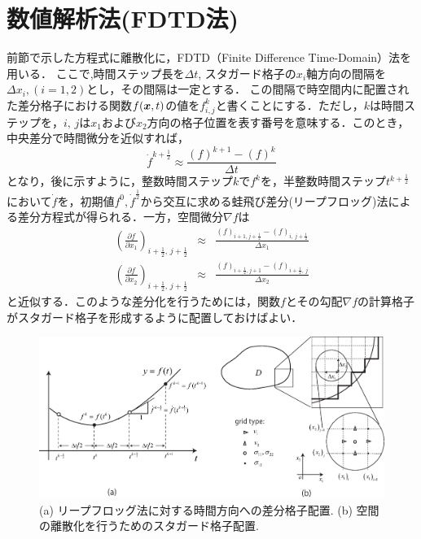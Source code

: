 \section{数値解析法(FDTD法)}
前節で示した方程式に離散化に，FDTD（Finite Difference Time-Domain）法を用いる．
ここで,時間ステップ長を$\Delta t$, スタガード格子の$x_i$軸方向の間隔を
$\Delta x_i,(i=1,2)$とし，その間隔は一定とする．
この間隔で時空間内に配置された差分格子における関数$f(\mbox{\boldmath $x$},t)$の値を$f^k_{i,j}$と書くことにする．ただし，$k$は時間ステップを，$i,\, j$は$x_1$および$x_2$方向の格子位置を表す番号を意味する．このとき，中央差分で時間微分を近似すれば，
\begin{equation}
	\dot{f}^{k+\frac{1}{2}} \approx \frac{ (f)^{k+1}-(f)^k}{\Delta t}
	\label{eqn:dfdt}
\end{equation}
となり，後に示すように，整数時間ステップ$k$で$f^k$を，半整数時間ステップ$t^{k+\frac{1}{2}}$において$\dot f$を，初期値$f^0, \dot f^{\frac{1}{2}}$から交互に求める蛙飛び差分(リープフロッグ)法による差分方程式が得られる．一方，空間微分$\nabla f$は
\begin{eqnarray}
	\left( \frac{\partial f}{\partial x_1}\right)
	_{i+\frac{1}{2}, \, j+\frac{1}{2}}
	& \approx &
		\frac{\left(f\right)_{i+1,j+\frac{1}{2}} -\left(f\right)_{i,\, j+\frac{1}{2}}}
		{\Delta x_1}
	\label{eqn:dfdx1}
	\\
	\left( \frac{\partial f}{\partial x_2}\right)
	_{i+\frac{1}{2}, \, j+\frac{1}{2}}
	& \approx &
	\frac{\left(f\right)_{i+\frac{1}{2},j+1} -\left(f\right)_{i+\frac{1}{2},\, j}}{\Delta x_2}
	\label{eqn:dfdx2}
\end{eqnarray}
と近似する．このような差分化を行うためには，関数$f$とその勾配$\nabla f$の計算格子がスタガード格子を形成するように配置しておけばよい．
\begin{figure}
     \begin{center}
     \includegraphics[width=1.0\linewidth]{Figs/FDgrid.eps}
     \end{center}
     \caption{ (a) リープフロッグ法に対する時間方向への差分格子配置.
	 (b) 空間の離散化を行うためのスタガード格子配置. 
	}
     \label{fig:FDgrids}
\end{figure}
